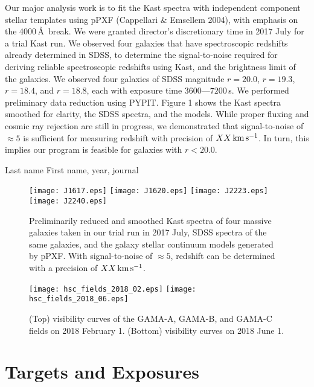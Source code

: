 \documentclass[letterpaper,12pt,dvips]{article}
\newenvironment{my_itemize}{
\begin{itemize}
  \setlength{\itemsep}{1pt}
  \setlength{\parskip}{0pt}
  \setlength{\parsep}{0pt}}{\end{itemize}
}
\begin{document}
Our major analysis work is to fit the Kast spectra with independent component stellar templates 
using pPXF (Cappellari \& Emsellem 2004), with emphasis on the 4000\,\AA\ break. We were granted 
director's discretionary time in 2017 July for a trial Kast run. We observed four galaxies that 
have spectroscopic redshifts already determined in SDSS, to determine the signal-to-noise required 
for deriving reliable spectroscopic redshifts using Kast, and the brightness limit of the 
galaxies. We observed four galaxies of SDSS magnitude $r=20.0$, $r=19.3$, $r=18.4$, and $r=18.8$, 
each with exposure time $3600\textrm{---}7200$\,s. We performed preliminary data reduction using 
PYPIT. Figure 1 shows the Kast spectra smoothed for clarity, the SDSS spectra, and the models. 
While proper fluxing and cosmic ray rejection are still in progress, we demonstrated that 
signal-to-noise of $\approx5$ is sufficient for measuring redshift with precision of 
$XX\,{\rm km\,s^{-1}}$. In turn, this implies our program is feasible for galaxies with $r<20.0$. 

\clearpage

\begin{my_itemize}
\item[] Last name First name, year, journal
\end{my_itemize}

\begin{figure}[hbt]
\texttt{[image: J1617.eps]}
\texttt{[image: J1620.eps]}
\texttt{[image: J2223.eps]}
\texttt{[image: J2240.eps]}
\caption{
Preliminarily reduced and smoothed Kast spectra of four massive galaxies taken in our trial run in 
2017 July, SDSS spectra of the same galaxies, and the galaxy stellar continuum models generated by 
pPXF. With signal-to-noise of $\approx5$, redshift can be determined with a precision of 
$XX\,{\rm km\,s^{-1}}$.}
\end{figure}

\begin{figure}[hbt]
\texttt{[image: hsc\_fields\_2018\_02.eps]}
\texttt{[image: hsc\_fields\_2018\_06.eps]}
\caption{(Top) visibility curves of the GAMA-A, GAMA-B, and GAMA-C fields on 2018 February 1. 
(Bottom) visibility curves on 2018 June 1.}
\end{figure}

\clearpage

\section{Targets and Exposures}
\end{document}
